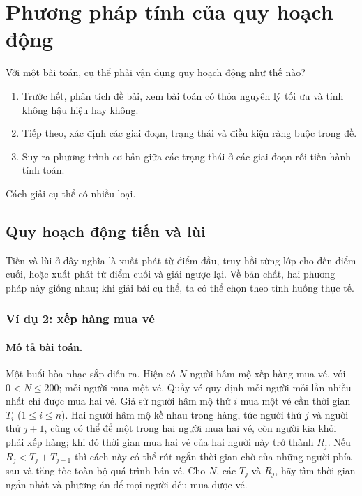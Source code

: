 \documentclass[11pt]{article}
\begin{document}
\section{Phương pháp tính của quy hoạch động}

Với một bài toán, cụ thể phải vận dụng quy hoạch động như thế nào?
\begin{enumerate}
  \item Trước hết, phân tích đề bài, xem bài toán có thỏa nguyên lý tối ưu và
  tính không hậu hiệu hay không.
  \item Tiếp theo, xác định các giai đoạn, trạng thái và điều kiện ràng buộc
  trong đề.
  \item Suy ra phương trình cơ bản giữa các trạng thái ở các giai đoạn rồi
  tiến hành tính toán.
\end{enumerate}

Cách giải cụ thể có nhiều loại.

\subsection{Quy hoạch động tiến và lùi}

Tiến và lùi ở đây nghĩa là xuất phát từ điểm đầu, truy hồi từng lớp cho đến
điểm cuối, hoặc xuất phát từ điểm cuối và giải ngược lại. Về bản chất, hai
phương pháp này giống nhau; khi giải bài cụ thể, ta có thể chọn theo tình
huống thực tế.

\subsubsection*{Ví dụ 2: xếp hàng mua vé}

\paragraph{Mô tả bài toán.}
Một buổi hòa nhạc sắp diễn ra. Hiện có $N$ người hâm mộ xếp hàng mua vé, với
$0<N\le 200$; mỗi người mua một vé. Quầy vé quy định mỗi người mỗi lần nhiều
nhất chỉ được mua hai vé. Giả sử người hâm mộ thứ $i$ mua một vé cần thời
gian $T_i$ ($1\le i\le n$). Hai người hâm mộ kề nhau trong hàng, tức người
thứ $j$ và người thứ $j+1$, cũng có thể để một trong hai người mua hai vé, còn
người kia khỏi phải xếp hàng; khi đó thời gian mua hai vé của hai người này
trở thành $R_j$. Nếu $R_j<T_j+T_{j+1}$ thì cách này có thể rút ngắn thời gian
chờ của những người phía sau và tăng tốc toàn bộ quá trình bán vé. Cho $N$,
các $T_j$ và $R_j$, hãy tìm thời gian ngắn nhất và phương án để mọi người đều
mua được vé.
\end{document}
